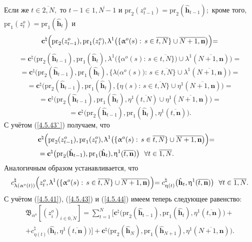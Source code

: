 \documentclass[11pt,twoside]{report}
\newcommand{\ov}{\overline}
\newcommand{\la}{\lambda}
\newcommand{\al}{\alpha}
\newcommand{\fa}{\forall}
\begin{document}
{{ Если же $t\in \ov{2,N},$ то $t-1\in \ov{1,N-1}$ и $\mathrm{pr}_2(z_{t-1}^o) =
\mathrm{pr}_2(\hat{\mathbf{h}}_{t-1});$ кроме того, $\mathrm{pr}_1(z_t^o) =
\mathrm{pr}_1(\hat{\mathbf{h}}_t)$ и
$$\mathbf{c}^\natural\Bigl(\mathrm{pr}_2(z_{t-1}^o),\mathrm{pr}_1(z_t^o),
\la^1\bigl(\{\al^o(s):\,s\in \ov{t,N}\}\cup \ov{N+1,\mathbf{n}}\bigl)\Bigl) =
$$
$$
= \mathbf{c}^\natural\bigl(\mathrm{pr}_2(\hat{\mathbf{h}}_{t-1}),
\mathrm{pr}_1(\hat{\mathbf{h}}_t),
\la^1\bigl(\{\al^o(s):\,s\in\ov{t,N}\}\bigl)\cup \la^1(\ov{N+1,\mathbf{n}})\bigl)=
$$
$$
= \mathbf{c}^\natural\bigl(\mathrm{pr}_2(\hat{\mathbf{h}}_{t-1}),
\mathrm{pr}_1(\hat{\mathbf{h}}_t),
\{\la\bigl(\al^o(s)\bigl):\,s\in\ov{t,N}\}\cup\la^1(\ov{N+1,\mathbf{n}})\bigl)=
$$
$$
=\mathbf{c}^\natural\bigl(\mathrm{pr}_2(\hat{\mathbf{h}}_{t-1}),
\mathrm{pr}_1(\hat{\mathbf{h}}_t),
\{\eta(s):\,s\in\ov{t,N}\}\cup \eta^1(\ov{N+1,\mathbf{n}})\bigl)=
$$
$$= \mathbf{c}^\natural\bigl(\mathrm{pr}_2(\hat{\mathbf{h}}_{t-1}),
\mathrm{pr}_1(\hat{\mathbf{h}}_t),
\eta^1(\ov{t,N})\cup \eta^1(\ov{N+1,\mathbf{n}})\bigl)=
$$
$$
=\mathbf{c}^\natural\bigl(\mathrm{pr}_2(\hat{\mathbf{h}}_{t-1}),
\mathrm{pr}_1(\hat{\mathbf{h}}_t),
\eta^1(\ov{t,\mathbf{n}})\bigl).
$$
С учётом (\ref{4.5.43`}) получаем, что
\begin{eqnarray}
&\mathbf{c}^\natural\Bigl(\mathrm{pr}_2(z_{t-1}^o),\mathrm{pr}_1(z_t^o),
\la^1\bigl(\{\al^o(s):\,s\in \ov{t,N}\}
\cup \ov{N+1,\mathbf{n}}\bigl)\Bigl)=
&\nonumber\\
&= \mathbf{c}^\natural\bigl(\mathrm{pr}_2(\hat{\mathbf{h}}_{t-1}),
\mathrm{pr}_1(\hat{\mathbf{h}}_t),
\eta^1(\ov{t,\mathbf{n}})\bigl)\ \ \fa t\in \ov{1,N}.
&\label{4.5.44}
\end{eqnarray}
Аналогичным образом устанавливается, что
$$c_{\la(\al^o(t))}^\natural\Bigl(z_t^o,\la^1\bigl(\{\al^o(s):\,s\in
\ov{t,N}\} \cup \ov{N+1,\mathbf{n}}\bigl)\Bigl) =
c_{\eta(t)}^\natural\bigl(\hat{\mathbf{h}}_t,\eta^1(\ov{t,\mathbf{n}})\bigl) \ \
\fa t\in\ov{1,N}.
$$
С учётом (\ref{4.5.41}), (\ref{4.5.43}) и (\ref{4.5.44}) имеем теперь следующее равенство:
\begin{eqnarray}
&\mathfrak{B}_{\al^o}[(z_i^o)_{i\in\ov{0,N}}] =
\sum\limits_{t=1}^N\bigl[\mathbf{c}^\natural\bigl(\mathrm{pr}_2(\hat{\mathbf{h}}_{t-1}),
\mathrm{pr}_1(\hat{\mathbf{h}}_t),\eta^1(\ov{t,\mathbf{n}})\bigl) +
&\nonumber\\
&+c_{\eta(t)}^\natural\bigl(\hat{\mathbf{h}}_t,\eta^1(\ov{t,\mathbf{n}})\bigl)
\bigl] + \mathbf{c}^\natural\bigl(\mathrm{pr}_2(\hat{\mathbf{h}}_N),
\mathrm{pr}_1(\hat{\mathbf{h}}_{N+1}),
\eta^1(\ov{N+1,\mathbf{n}})\bigl).

\end{eqnarray}}}
\end{document}

